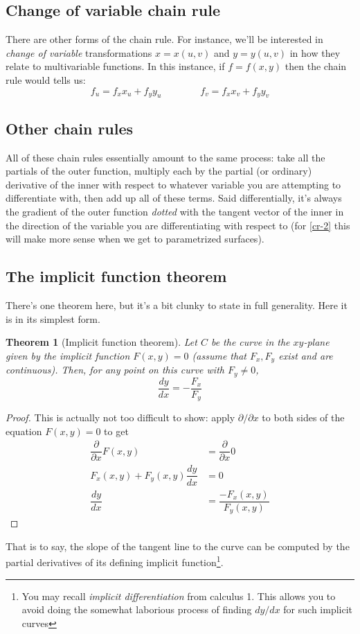 \documentclass[12pt]{article}
\numberwithin{equation}{subsection}
\numberwithin{figure}{subsection}
\newtheorem{thm}[subsection]{Theorem}
\theoremstyle{note}
\begin{document}
{\subsection{Change of variable chain rule} There are other forms of the chain rule. For instance, we'll be interested in \textit{change of variable} transformations $x=x(u,v)$ and $y=y(u,v)$ in how they relate to multivariable functions. In this instance, if $f=f(x,y)$ then the chain rule would tells us:
\begin{equation} \label{cr-2} f_u = f_x x_u+f_y y_u \qquad \qquad f_v = f_x x_v+f_y y_v\end{equation} 


\subsection{Other chain rules} All of these chain rules essentially amount to the same process: take all the partials of the outer function, multiply each by the partial (or ordinary) derivative of the inner with respect to whatever variable you are attempting to differentiate with, then add up all of these terms. Said differentially, it's always the gradient of the outer function \textit{dotted} with the tangent vector of the inner in the direction of the variable you are differentiating with respect to (for \eqref{cr-2} this will make more sense when we get to parametrized surfaces).

\subsection{The implicit function theorem}
There's one theorem here, but it's a bit clunky to state in full generality. Here it is in its simplest form.

\begin{thm}[Implicit function theorem] Let $C$ be the curve in the $xy$-plane given by the implicit function $F(x,y)=0$ (assume that $F_x,F_y$ exist and are continuous). Then, for any point on this curve with $F_y\neq 0$, \begin{equation} \dfrac{dy}{dx}= -\dfrac{F_x}{F_y}\label{ift}\end{equation}
\end{thm}
\begin{proof}
	This is actually not too difficult to show: apply $\partial/\partial x$ to both sides of the equation $F(x,y)=0$ to get \begin{align*}
		\dfrac{\partial}{\partial x} F(x,y)&= \dfrac{\partial}{\partial x} 0 \\
		F_x(x,y)+F_y(x,y)\dfrac{dy}{dx}&=0\\
		\dfrac{dy}{dx}&=\dfrac{-F_x(x,y)}{F_y(x,y)}
	\end{align*}
\end{proof}
That is to say, the slope of the tangent line to the curve can be computed by the partial derivatives of its defining implicit function\footnote{You may recall \textit{implicit differentiation} from calculus 1. This allows you to avoid doing the somewhat laborious process of finding $dy/dx$ for such implicit curves}. 


}
\end{document}
